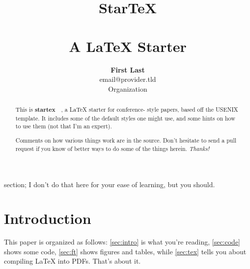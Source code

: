 \documentclass[letterpaper,twocolumn,10pt,final]{article}
\begin{document}
\date{}

\title{\selectfont
    {\huge{\textbf{StarTeX}}}\\
    {\large{\textbf{\\A LaTeX Starter}}}}


\author{
{\rm \textbf{First Last}}\\
{\rm email@provider.tld}\\
Organization\\
} %

\maketitle

\thispagestyle{empty}



\begin{abstract}
This is \textbf{startex}~\cite{startex}~, a LaTeX starter for conference-
style papers, based off the USENIX template. It includes some of the default
styles one might use, and some hints on how to use them (not that I'm an
expert).

Comments on how various things work are in the source. Don't hesitate to send
a pull request if you know of better ways to do some of the things herein.
\textit{Thanks!}
\end{abstract}

section; I don't do that here for your ease of learning, but you should.


\section{\label{sec:intro}Introduction}
This paper is organized as follows: \autoref{sec:intro} is what you're
reading, \autoref{sec:code} shows some code, \autoref{sec:ft} shows figures
and tables, while \autoref{sec:tex} tells you about compiling LaTeX into PDFs.
That's about it.
\end{document}
